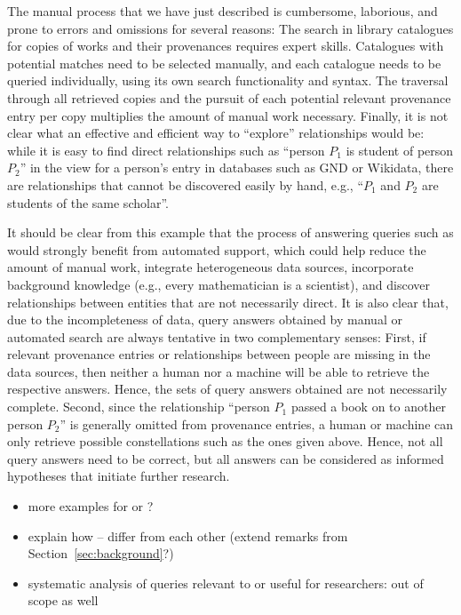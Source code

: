 The manual process that we have just described is cumbersome, laborious, and prone to errors and omissions for several reasons:
The search in library catalogues for copies of works and their provenances requires expert skills.
Catalogues with potential matches need to be selected manually,
and each catalogue needs to be queried individually, using its own search functionality and syntax. 
The traversal through all retrieved copies and the pursuit of each potential relevant provenance entry per copy 
multiplies the amount of manual work necessary.
Finally, it is not clear what an effective and efficient way to \enquote{explore} relationships would be:
while it is easy to find direct relationships such as \enquote{person $P_1$ is student of person $P_2$} in the view for a person's entry
in databases such as GND or Wikidata, there are relationships that cannot be discovered easily by hand,
e.g., \enquote{$P_1$ and $P_2$ are students of the same scholar}.

It should be clear from this example that the process of answering queries such as 
would strongly benefit from automated support, which could help reduce the amount of manual work, integrate heterogeneous data sources,
incorporate background knowledge (e.g., every mathematician is a scientist),
and discover relationships between entities that are not necessarily direct.
It is also clear that, due to the incompleteness of data, query answers obtained by manual or automated search
are always tentative in two complementary senses: First, if relevant provenance entries or relationships between people are missing
in the data sources, then neither a human nor a machine will be able to retrieve the respective answers. Hence, the sets of query answers obtained
are not necessarily complete.
Second, since the relationship \enquote{person $P_1$ passed a book on to another person $P_2$} is generally omitted from
provenance entries, a human or machine can only retrieve possible constellations such as the ones
given above. Hence, not all query answers need to be correct, but all answers can be considered
as informed hypotheses that initiate further research.


%
\begin{itemize}
  \item
    more examples for  or ?
  \item
    explain how -- differ from each other (extend remarks from Section~\ref{sec:background}?)
  \item
    systematic analysis of queries relevant to or useful for researchers: out of scope as well
\end{itemize}
